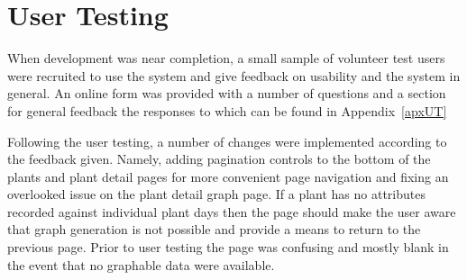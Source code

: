 \section{User Testing}

When development was near completion, a small sample of volunteer test users were recruited to use the system and give feedback on usability and the system in general. An online form was provided with a number of questions and a section for general feedback the responses to which can be found in Appendix~\ref{apxUT}

Following the user testing, a number of changes were implemented according to the feedback given. Namely, adding pagination controls to the bottom of the plants and plant detail pages for more convenient page navigation and fixing an overlooked issue on the plant detail graph page. If a plant has no attributes recorded against individual plant days then the page should make the user aware that graph generation is not possible and provide a means to return to the previous page. Prior to user testing the page was confusing and mostly blank in the event that no graphable data were available.


